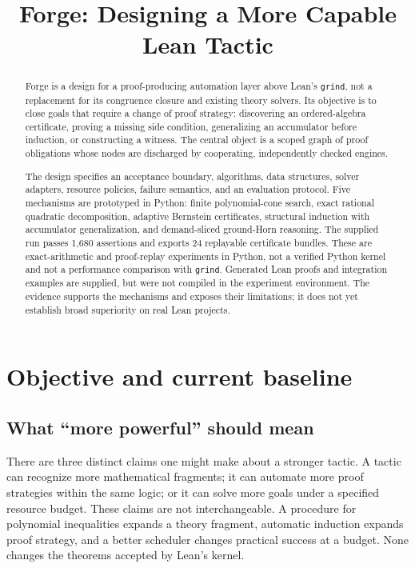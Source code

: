\documentclass[11pt,letterpaper]{article}
\title{Forge: Designing a More Capable Lean Tactic}
\author{}
\date{}
\newcommand{\Lean}{\textsf{Lean}}
\newcommand{\Forge}{\textsf{Forge}}
\newcommand{\grind}{\texttt{grind}}
\theoremstyle{definition}
\theoremstyle{remark}
\begin{document}
\maketitle
\begin{abstract}
\noindent
\Forge{} is a design for a proof-producing automation layer above \Lean's \grind{}, not a replacement for its congruence closure and existing theory solvers. Its objective is to close goals that require a change of proof strategy: discovering an ordered-algebra certificate, proving a missing side condition, generalizing an accumulator before induction, or constructing a witness. The central object is a scoped graph of proof obligations whose nodes are discharged by cooperating, independently checked engines.

The design specifies an acceptance boundary, algorithms, data structures, solver adapters, resource policies, failure semantics, and an evaluation protocol. Five mechanisms are prototyped in Python: finite polynomial-cone search, exact rational quadratic decomposition, adaptive Bernstein certificates, structural induction with accumulator generalization, and demand-sliced ground-Horn reasoning. The supplied run passes 1,680 assertions and exports 24 replayable certificate bundles. These are exact-arithmetic and proof-replay experiments in Python, not a verified Python kernel and not a performance comparison with \grind{}. Generated \Lean{} proofs and integration examples are supplied, but were not compiled in the experiment environment. The evidence supports the mechanisms and exposes their limitations; it does not yet establish broad superiority on real \Lean{} projects.
\end{abstract}
\newpage
\tableofcontents
\newpage

\section{Objective and current baseline}
\subsection{What ``more powerful'' should mean}
There are three distinct claims one might make about a stronger tactic. A tactic can recognize more mathematical fragments; it can automate more proof strategies within the same logic; or it can solve more goals under a specified resource budget. These claims are not interchangeable. A procedure for polynomial inequalities expands a theory fragment, automatic induction expands proof strategy, and a better scheduler changes practical success at a budget. None changes the theorems accepted by \Lean's kernel.
\end{document}

